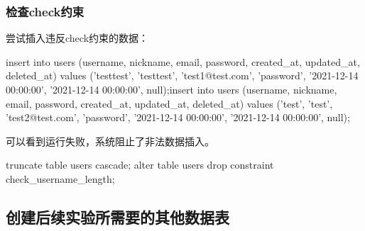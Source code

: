 \documentclass{ctexrep}
\begin{document}
\subsubsection{检查check约束}
尝试插入违反check约束的数据：
\begin{run}
    insert into users (username, nickname, email, password, created_at, updated_at, deleted_at) values ('testtest', 'testtest', 'test1@test.com', 'password', '2021-12-14 00:00:00', '2021-12-14 00:00:00', null);insert into users (username, nickname, email, password, created_at, updated_at, deleted_at) values ('test', 'test', 'test2@test.com', 'password', '2021-12-14 00:00:00', '2021-12-14 00:00:00', null);
\end{run}
可以看到运行失败，系统阻止了非法数据插入。
\begin{runsilent}
    truncate table users cascade;
    alter table users drop constraint check_username_length;
\end{runsilent}

\subsection{创建后续实验所需要的其他数据表}
\end{document}
